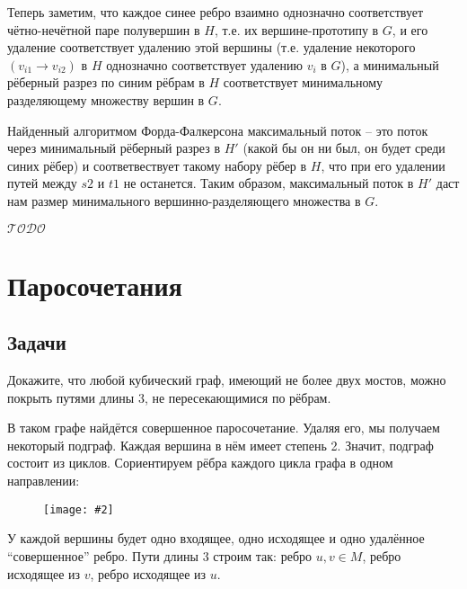 \documentclass[a4paper,12pt]{article}
\numberwithin{figure}{section}
\def\TODO{\guillemotleft$\mathcal{TODO}$\guillemotright\textellipsis}
\newcommand\CenterFigure[2]{\begin{figure}[H]\centering\texttt{[image: \#2]}\end{figure}}
\begin{document}
\begin{solution}
	Теперь заметим, что каждое синее ребро взаимно однозначно соответствует чётно-нечётной паре полувершин в $H$, т.е. их вершине-прототипу в $G$, и его удаление соответствует удалению этой вершины (т.е. удаление некоторого $(v_{i1} \rightarrow v_{i2})$ в $H$ однозначно соответствует удалению $v_i$ в $G$), а минимальный рёберный разрез по синим рёбрам в $H$ соответствует минимальному разделяющему множеству вершин в $G$.
	
	Найденный алгоритмом Форда-Фалкерсона максимальный поток -- это поток через минимальный рёберный разрез в $H'$ (какой бы он ни был, он будет среди синих рёбер) и соответвествует такому набору рёбер в $H$, что при его удалении путей между $s2$ и $t1$ не останется. Таким образом, максимальный поток в $H'$ даст нам размер минимального вершинно-разделяющего множества в $G$.
\end{solution}

\TODO



\section{Паросочетания}

\subsection{Задачи}

\begin{problem}
	Докажите, что любой кубический граф, имеющий не более двух мостов, можно покрыть путями длины 3, не пересекающимися по рёбрам.
\end{problem}
\begin{solution}
	В таком графе найдётся совершенное паросочетание. Удаляя его, мы получаем некоторый подграф. Каждая вершина в нём имеет степень 2. Значит, подграф состоит из циклов. Сориентируем рёбра каждого цикла графа в одном направлении:
		\CenterFigure{10cm}{cubic-graph-cover-paths-3.png}
	У каждой вершины будет одно входящее, одно исходящее и одно удалённое ``совершенное'' ребро. Пути длины 3 строим так: ребро ${u,v} \in M$, ребро исходящее из $v$, ребро исходящее из $u$.
\end{solution}
\end{document}
